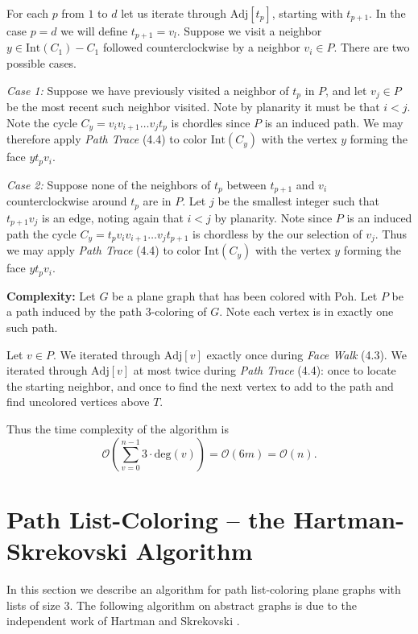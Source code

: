 \documentclass[letterpaper, 12pt]{article}
\theoremstyle{definition}
\theoremstyle{definition}
\theoremstyle{thm}
\theoremstyle{definition}
\begin{document}
For each $p$ from $1$ to $d$ let us iterate through
$\text{Adj}[t_p]$, starting with $t_{p+1}$. In the case $p=d$ we will define
$t_{p+1}=v_l$. Suppose we visit a neighbor $y\in \text{Int}(C_1)-C_1$ followed
counterclockwise by a neighbor $v_i\in P$. There are two possible cases.

\textit{Case 1:} Suppose we have previously visited a neighbor of $t_p$ in $P$,
and let $v_j\in P$ be the most recent such neighbor visited. Note by planarity
it must be that $i<j$. Note the cycle $C_y=v_iv_{i+1}\ldots v_jt_p$ is chordles
since $P$ is an induced path.
We may therefore apply \textit{Path Trace} (4.4) to color $\text{Int}(C_y)$ with
the vertex $y$ forming the face $yt_pv_i$.

\textit{Case 2:} Suppose none of the neighbors of $t_p$ between $t_{p+1}$ and
$v_i$ counterclockwise around $t_p$ are in $P$. Let
$j$ be the smallest integer such that $t_{p+1}v_j$ is an edge, noting again
that $i<j$ by planarity. Note since $P$ is an induced path the cycle
$C_y=t_pv_iv_{i+1}\ldots v_jt_{p+1}$ is chordless by the our selection of $v_j$.
Thus we may apply \textit{Path Trace} (4.4) to color $\text{Int}(C_y)$ with the
vertex $y$ forming the face $yt_pv_i$.

\noindent\textbf{Complexity:} Let $G$ be a plane graph that has been colored
with Poh. Let $P$ be a path induced by the path $3$-coloring of $G$. Note each
vertex is in exactly one such path.

Let $v\in P$. We iterated through $\text{Adj}[v]$ exactly once during
\textit{Face Walk} (4.3). We iterated through $\text{Adj}[v]$ at most twice
during \textit{Path Trace} (4.4): once to locate
the starting neighbor, and once to find the next vertex to add to the path and
find uncolored vertices above $T$.

Thus the time complexity of the algorithm is
\[
    \mathcal{O}\left(\sum_{v=0}^{n-1}3\cdot\text{deg}(v)\right)
    =\mathcal{O}(6m)=\mathcal{O}(n).
\]



\section{Path List-Coloring -- the Hartman-Skrekovski Algorithm}

In this section we describe an algorithm for path
list-coloring plane graphs with lists of size $3$. The following algorithm on
abstract graphs is due to the independent work of Hartman \cite{hartman} and
Skrekovski \cite{skrekovski}.
\end{document}
